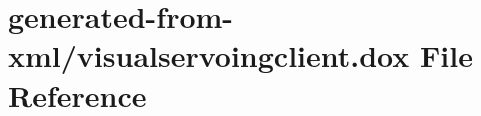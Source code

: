 \hypertarget{visualservoingclient_8dox}{}\section{generated-\/from-\/xml/visualservoingclient.dox File Reference}
\label{visualservoingclient_8dox}
